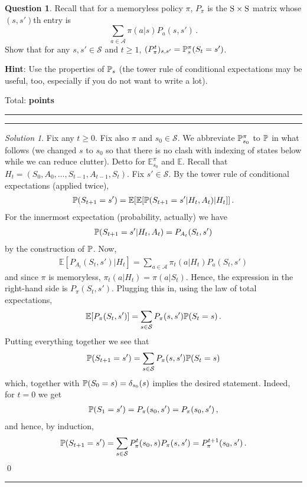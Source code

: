 \documentclass{article}
\DeclareMathOperator*{\1}{\mathbbm{1}}
\newcommand{\E}{\mathbb E}
\newcommand{\EE}[1]{\E[#1]}
\newcounter{DocPoints} %
\newcounter{QuestionPoints} %
\newcommand{\tpoints}[1]{        %
	\ifthenelse{\isempty{#1}}%
	{%
	}%
	{%
		\addtocounter{DocPoints}{#1}
		\addtocounter{QuestionPoints}{#1}
	}													 %
	\par\mbox{}\par\noindent\hfill {Total: \bf \arabic{QuestionPoints}\xspace points}\par\mbox{}\par\hrule\hrule
	\setcounter{QuestionPoints}{0}
}
\theoremstyle{definition}
\newtheorem{question}{Question}
\theoremstyle{remark}
\newtheorem*{solution*}{Solution}
\newcommand{\hint}{\noindent \textbf{Hint}:\xspace}
\newcommand{\cS}{\mathcal{S}}
\newcommand{\cA}{\mathcal{A}}
\begin{document}
\begin{question}
Recall that for a memoryless policy $\pi$, $P_\pi$ 
is the $\mathrm{S} \times \mathrm{S}$ matrix whose $(s,s')$th entry is 
\[
\sum_{a\in \cA} \pi(a|s) P_a(s,s')\,.
\] 
Show that for any $s,s'\in \cS$ and $t\ge 1$, $(P_\pi^t)_{s,s'} = \mathbb{P}_s^\pi(S_t=s')$.

\hint Use the properties of $\mathbb{P}_s$ (the tower rule of conditional expectations may be useful, too, especially if you do not want to write a lot).
\tpoints{10}
\end{question}
\begin{solution*}
Fix any $t\ge 0$. Fix also $\pi$ and $s_0\in \cS$. We abbreviate $\mathbb{P}_{s_0}^\pi$ to $\mathbb{P}$ in what follows (we changed $s$ to $s_0$ so that there is no clash with indexing of states below while we can reduce clutter).
Detto for $\E_{s_0}^\pi$ and $\mathbb{E}$.
Recall that $H_t = (S_0,A_0,\dots,S_{t-1},A_{t-1},S_t)$.
Fix $s'\in \cS$.
By the tower rule of conditional expectations (applied twice),
\begin{align*}
\PP(S_{t+1}=s')
=\EE{ \EE{ \PP(S_{t+1}=s'|H_t,A_t)  | H_t } }\,.
\end{align*}
For the innermost expectation (probability, actually) we have
\begin{align*}
\mathbb{P}(S_{t+1}=s'|H_t,A_t) = P_{A_t}(S_t,s')
\end{align*}
by the construction of $\mathbb{P}$.
Now,
\begin{align*}
\EE{ P_{A_t}(S_t,s') | H_t } = \sum_{a\in \cA} \pi_t(a|H_t) P_a(S_t,s')
\end{align*}
and since $\pi$ is memoryless, $\pi_t(a|H_t) = \pi(a|S_t)$. 
Hence, the expression in the right-hand side is $P_\pi(S_t,s')$. 
Plugging this in, using the law of total expectations,
\begin{align*}
\EE{ P_{\pi}(S_t,s') } = \sum_{s\in \cS} P_{\pi}(s,s') \PP(S_t=s)\,.
\end{align*}
Putting everything together we see that
\begin{align*}
\PP(S_{t+1}=s') = \sum_{s\in \cS} P_{\pi}(s,s') \PP(S_t=s)
\end{align*}
which, together with $\mathbb{P}(S_0=s)=\delta_{s_0}(s)$ implies the desired statement.
Indeed, for $t=0$ we get
\begin{align*}
\mathbb{P}(S_{1}=s') = P_{\pi}(s_0,s') = P_{\pi}(s_0,s')\,,
\end{align*}
and hence, by induction,
\begin{align*}
\PP(S_{t+1}=s') = \sum_{s\in \cS}  P_\pi^t(s_0,s) P_{\pi}(s,s')
= P_\pi^{t+1}(s_0,s')\,.
\end{align*}
\qed\par\smallskip\hrule
\end{solution*}
\end{document}

